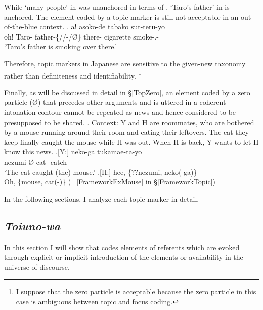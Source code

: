 While  `many people' in \Last was unanchored in terms of ,
 `Taro's father' in \Next is anchored.
The element coded by a topic marker is still not acceptable in an out-of-the-blue context.
%
\exg. a!   asoko-de tabako sut-teru-yo \\
 oh! Taro- father-\{//-/{\O}\} there- cigarette smoke-.- \\
 `Taro's father is smoking over there.'

Therefore, topic markers in Japanese are sensitive to the given-new taxonomy rather than definiteness and identifiability.%
 \footnote{
 I suppose that the zero particle is acceptable
 because the zero particle in this case is ambiguous between topic and focus coding.
 }

Finally, as will be discussed in detail in \S \ref{TopZero},
an element coded by a zero particle ({\O}) that precedes other arguments and is uttered in a coherent intonation contour
cannot be repeated as news and hence considered to be presupposed to be shared.
\ex. \label{mouse}Context: Y and H are roommates,
	who are bothered by a mouse running around their room
	and eating their leftovers.
	The cat they keep finally caught the mouse while H was out.
	When H is back, Y wants to let H know this news.
	\ag.[Y:]  neko-ga tukamae-ta-yo \\
		nezumi-{\O} cat- catch-- \\
		`The cat caught (the) mouse.'
	\b.[H:] hee, \{??nezumi, neko(-ga)\} \\
	  Oh, \{mouse, cat(-)\}
	  \hfill{(=\ref{FrameworkExMouse} in \S \ref{FrameworkTopic})}


In the following sections,
I analyze each topic marker in detail.

\subsection{\textit{Toiuno-wa}}\label{Toiunowa}

In this section
I will show that  codes elements of referents
which are evoked
through explicit or implicit introduction of the elements or
availability in the universe of discourse.

